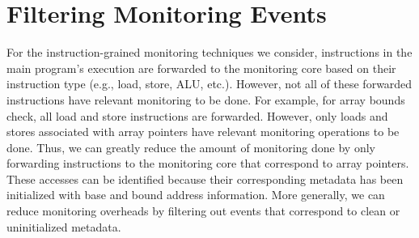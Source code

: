 \section{Filtering Monitoring Events}
\label{sec:filter}

For the instruction-grained monitoring techniques we consider, instructions in
the main program's execution are forwarded to the monitoring core based on
their instruction type (e.g., load, store, ALU, etc.).
However, not all of these forwarded instructions have relevant monitoring to be
done. For example, for array bounds check, all load and store instructions are
forwarded. However, only loads and stores associated with array pointers have
relevant monitoring operations to be done. Thus, we can greatly reduce the amount of
monitoring done by only forwarding instructions to the monitoring core that 
correspond to array pointers. These accesses can be identified because their
corresponding metadata has been initialized with base and bound address information.
More generally, we can reduce monitoring overheads by filtering out 
events that correspond to clean or uninitialized metadata.

